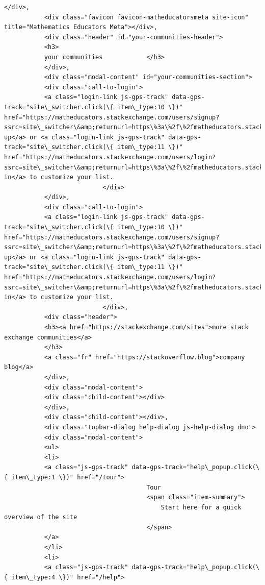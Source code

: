 \documentclass[11pt]{article}
\begin{document}
\begin{Verbatim}[commandchars=\\\{\}]
           </div>,
           <div class="favicon favicon-matheducatorsmeta site-icon" title="Mathematics Educators Meta"></div>,
           <div class="header" id="your-communities-header">
           <h3>
           your communities            </h3>
           </div>,
           <div class="modal-content" id="your-communities-section">
           <div class="call-to-login">
           <a class="login-link js-gps-track" data-gps-track="site\_switcher.click(\{ item\_type:10 \})" href="https://matheducators.stackexchange.com/users/signup?ssrc=site\_switcher\&amp;returnurl=https\%3a\%2f\%2fmatheducators.stackexchange.com\%2f">Sign up</a> or <a class="login-link js-gps-track" data-gps-track="site\_switcher.click(\{ item\_type:11 \})" href="https://matheducators.stackexchange.com/users/login?ssrc=site\_switcher\&amp;returnurl=https\%3a\%2f\%2fmatheducators.stackexchange.com\%2f">log in</a> to customize your list.
                           </div>
           </div>,
           <div class="call-to-login">
           <a class="login-link js-gps-track" data-gps-track="site\_switcher.click(\{ item\_type:10 \})" href="https://matheducators.stackexchange.com/users/signup?ssrc=site\_switcher\&amp;returnurl=https\%3a\%2f\%2fmatheducators.stackexchange.com\%2f">Sign up</a> or <a class="login-link js-gps-track" data-gps-track="site\_switcher.click(\{ item\_type:11 \})" href="https://matheducators.stackexchange.com/users/login?ssrc=site\_switcher\&amp;returnurl=https\%3a\%2f\%2fmatheducators.stackexchange.com\%2f">log in</a> to customize your list.
                           </div>,
           <div class="header">
           <h3><a href="https://stackexchange.com/sites">more stack exchange communities</a>
           </h3>
           <a class="fr" href="https://stackoverflow.blog">company blog</a>
           </div>,
           <div class="modal-content">
           <div class="child-content"></div>
           </div>,
           <div class="child-content"></div>,
           <div class="topbar-dialog help-dialog js-help-dialog dno">
           <div class="modal-content">
           <ul>
           <li>
           <a class="js-gps-track" data-gps-track="help\_popup.click(\{ item\_type:1 \})" href="/tour">
                                       Tour
                                       <span class="item-summary">
                                           Start here for a quick overview of the site
                                       </span>
           </a>
           </li>
           <li>
           <a class="js-gps-track" data-gps-track="help\_popup.click(\{ item\_type:4 \})" href="/help">

\end{Verbatim}
\end{document}
